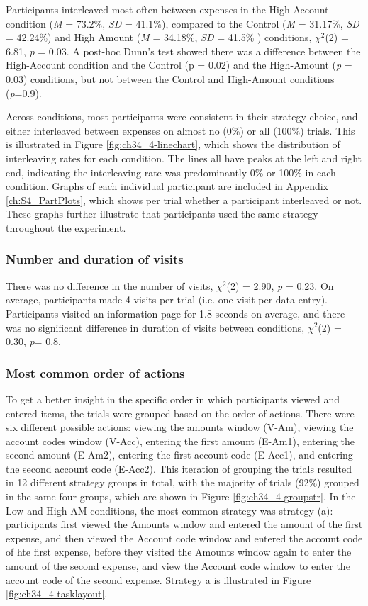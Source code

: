 Participants interleaved most often between expenses in the High-Account condition (\textit{M} = 73.2\%, \textit{SD} = 41.1\%), compared to the Control (\textit{M} = 31.17\%, \textit{SD} = 42.24\%) and High Amount (\textit{M} = 34.18\%, \textit{SD} = 41.5\% ) conditions, $\chi^2$(2) = 6.81, \textit{p} = 0.03. A post-hoc Dunn's test showed there was a difference between the High-Account condition and the Control (p = 0.02) and the High-Amount (\textit{p} = 0.03) conditions, but not between the Control and High-Amount conditions (\textit{p}=0.9).

Across conditions, most participants were consistent in their strategy choice, and either interleaved between expenses on almost no (0\%) or all (100\%) trials. This is illustrated in Figure \ref{fig:ch34_4-linechart}, which shows the distribution of interleaving rates for each condition. The lines all have peaks at the left and right end, indicating the interleaving rate was predominantly 0\% or 100\% in each condition. Graphs of each individual participant are included in Appendix \ref{ch:S4_PartPlots}, which shows per trial whether a participant interleaved or not. These graphs further illustrate that participants used the same strategy throughout the experiment.

\subsubsection{Number and duration of visits}
There was no difference in the number of visits, $\chi^2$(2) = 2.90, \textit{p} = 0.23. On average, participants made 4 visits per trial (i.e. one visit per data entry). Participants visited an information page for 1.8 seconds on average, and there was no significant difference in duration of visits between conditions, $\chi^2$(2) = 0.30, \textit{p}= 0.8. 

\subsubsection{Most common order of actions}\label{sec:ch34-StrategyFreq}
To get a better insight in the specific order in which participants viewed and entered items, the trials were grouped based on the order of actions. There were six different possible actions: viewing the amounts window (V-Am), viewing the account codes window (V-Acc), entering the first amount (E-Am1), entering the second amount (E-Am2), entering the first account code (E-Acc1), and entering the second account code (E-Acc2). This iteration of grouping the trials resulted in 12 different strategy groups in total, with the majority of trials (92\%) grouped in the same four groups, which are shown in Figure \ref{fig:ch34_4-groupstr}. In the Low and High-AM conditions, the most common strategy was strategy (a): participants first viewed the Amounts window and entered the amount of the first expense, and then viewed the Account code window and entered the account code of hte first expense, before they visited the Amounts window again to enter the amount of the second expense, and view the Account code window to enter the account code of the second expense. Strategy a is illustrated in Figure \ref{fig:ch34_4-tasklayout}.


